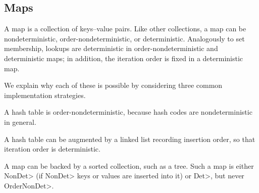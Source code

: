 \subsection{Maps}\label{maps}
A map is a collection of keys--value pairs.
Like other collections, a map can be nondeterministic,
order-nondeterministic, or deterministic.
Analogously to set membership, lookups are deterministic in
order-nondeterministic and deterministic maps; in addition, the iteration
order is fixed in a deterministic map.

We explain why each of these is possible by considering three common
implementation strategies.

A hash table is order-nondeterministic, because hash codes are
nondeterministic in general.

A hash table can be augmented by a linked list recording insertion order,
so that iteration order is deterministic.

A map can be backed by a sorted collection, such as a tree.  Such a map is
either \<NonDet> (if \<NonDet> keys or values are inserted into it) or
\<Det>, but never \<OrderNonDet>.


